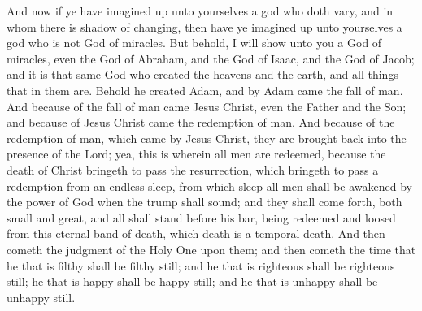 And now if ye have imagined up unto yourselves a god who doth vary, and in whom there is shadow of changing, then have ye imagined up unto yourselves a god who is not God of miracles.
\bverse \iffalse But behold, I will show unto you a God of miracles, even the God of Abraham, and the God of Isaac, and the God of Jacob; and it is that same God who created the heavens and the earth, and all things that in them are. \fi
But behold, I will show unto you a God of miracles, even the God of Abraham, and the God of Isaac, and the God of Jacob; and it is that same God who created the heavens and the earth, and all things that in them are.
\bverse \iffalse Behold he created Adam, and by Adam came the fall of man.  And because of the fall of man came Jesus Christ, even the Father and the Son; and because of Jesus Christ came the redemption of man. \fi
Behold he created Adam, and by Adam came the fall of man.  And because of the fall of man came Jesus Christ, even the Father and the Son; and because of Jesus Christ came the redemption of man.
\bverse \iffalse And because of the redemption of man, which came by Jesus Christ, they are brought back into the presence of the Lord; yea, this is wherein all men are redeemed, because the death of Christ bringeth to pass the resurrection, which bringeth to pass a redemption from an endless sleep, from which sleep all men shall be awakened by the power of God when the trump shall sound; and they shall come forth, both small and great, and all shall stand before his bar, being redeemed and loosed from this eternal band of death, which death is a temporal death. \fi
And because of the redemption of man, which came by Jesus Christ, they are brought back into the presence of the Lord; yea, this is wherein all men are redeemed, because the death of Christ bringeth to pass the resurrection, which bringeth to pass a redemption from an endless sleep, from which sleep all men shall be awakened by the power of God when the trump shall sound; and they shall come forth, both small and great, and all shall stand before his bar, being redeemed and loosed from this eternal band of death, which death is a temporal death.
\bverse \iffalse And then cometh the judgment of the Holy One upon them; and then cometh the time that he that is filthy shall be filthy still; and he that is righteous shall be righteous still; he that is happy shall be happy still; and he that is unhappy shall be unhappy still. \fi
And then cometh the judgment of the Holy One upon them; and then cometh the time that he that is filthy shall be filthy still; and he that is righteous shall be righteous still; he that is happy shall be happy still; and he that is unhappy shall be unhappy still.
